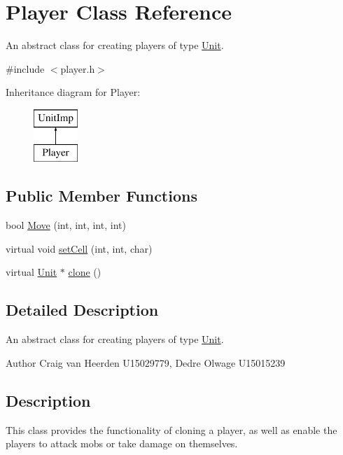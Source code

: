 \hypertarget{class_player}{\section{\-Player \-Class \-Reference}
\label{class_player}
}


\-An abstract class for creating players of type \hyperlink{class_unit}{\-Unit}.  




{\ttfamily \#include $<$player.\-h$>$}

\-Inheritance diagram for \-Player\-:\begin{figure}[H]
\begin{center}
\leavevmode
\includegraphics[height=2.000000cm]{class_player}
\end{center}
\end{figure}
\subsection*{\-Public \-Member \-Functions}
\begin{DoxyCompactItemize}
\item 
bool \hyperlink{class_player_a35fec59a1a85793af00b7cccebe58549}{\-Move} (int, int, int, int)
\item 
virtual void \hyperlink{class_player_a7ed0fb38b434823156402d273bd5cf2b}{set\-Cell} (int, int, char)
\item 
virtual \hyperlink{class_unit}{\-Unit} $\ast$ \hyperlink{class_player_ae3933224b71e261e4e166576ca9483f8}{clone} ()
\end{DoxyCompactItemize}


\subsection{\-Detailed \-Description}
\-An abstract class for creating players of type \hyperlink{class_unit}{\-Unit}. 

\begin{DoxyAuthor}{\-Author}
\-Craig van \-Heerden \-U15029779, \-Dedre \-Olwage \-U15015239
\end{DoxyAuthor}
\hypertarget{class_unit_factory_Description}{}\subsection{\-Description}\label{class_unit_factory_Description}
\-This class provides the functionality of cloning a player, as well as enable the players to attack mobs or take damage on themselves. 

